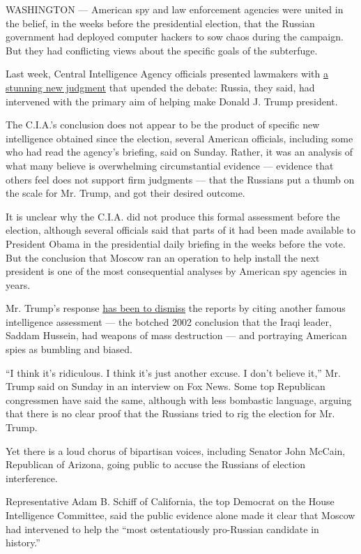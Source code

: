 WASHINGTON --- American spy and law enforcement agencies were united in
the belief, in the weeks before the presidential election, that the
Russian government had deployed computer hackers to sow chaos during the
campaign. But they had conflicting views about the specific goals of the
subterfuge.

Last week, Central Intelligence Agency officials presented lawmakers
with
\href{https://www.nytimes.com/2016/12/09/us/obama-russia-election-hack.html}{a
stunning new judgment} that upended the debate: Russia, they said, had
intervened with the primary aim of helping make Donald J. Trump
president.

The C.I.A.'s conclusion does not appear to be the product of specific
new intelligence obtained since the election, several American
officials, including some who had read the agency's briefing, said on
Sunday. Rather, it was an analysis of what many believe is overwhelming
circumstantial evidence --- evidence that others feel does not support
firm judgments --- that the Russians put a thumb on the scale for Mr.
Trump, and got their desired outcome.

It is unclear why the C.I.A. did not produce this formal assessment
before the election, although several officials said that parts of it
had been made available to President Obama in the presidential daily
briefing in the weeks before the vote. But the conclusion that Moscow
ran an operation to help install the next president is one of the most
consequential analyses by American spy agencies in years.

Mr. Trump's response
\href{https://www.nytimes.com/2016/12/11/us/politics/trump-russia-democrats.html}{has
been to dismiss} the reports by citing another famous intelligence
assessment --- the botched 2002 conclusion that the Iraqi leader, Saddam
Hussein, had weapons of mass destruction --- and portraying American
spies as bumbling and biased.

``I think it's ridiculous. I think it's just another excuse. I don't
believe it,'' Mr. Trump said on Sunday in an interview on Fox News. Some
top Republican congressmen have said the same, although with less
bombastic language, arguing that there is no clear proof that the
Russians tried to rig the election for Mr. Trump.

Yet there is a loud chorus of bipartisan voices, including Senator John
McCain, Republican of Arizona, going public to accuse the Russians of
election interference.

Representative Adam B. Schiff of California, the top Democrat on the
House Intelligence Committee, said the public evidence alone made it
clear that Moscow had intervened to help the ``most ostentatiously
pro-Russian candidate in history.''


